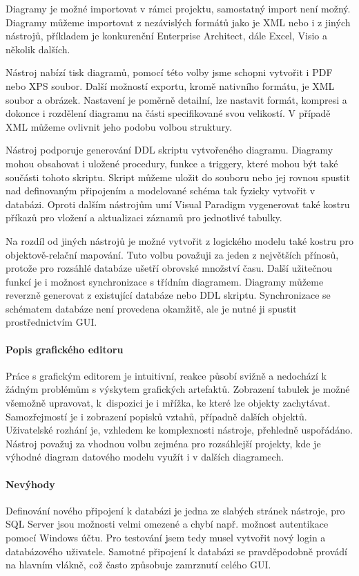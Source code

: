 \documentclass[czech,bachelor,public,dept460,male,oneside]{diploma}
\begin{document}
		Diagramy je možné importovat v rámci projektu, samostatný import není možný. Diagramy můžeme importovat z nezávislých formátů jako je XML nebo i z jiných nástrojů, příkladem je konkurenční Enterprise Architect, dále Excel, Visio a několik dalších. 
		
		Nástroj nabízí tisk diagramů, pomocí této volby jsme schopni vytvořit i PDF nebo XPS soubor. Další možností exportu, kromě nativního formátu, je XML soubor a obrázek. Nastavení je poměrně detailní, lze nastavit formát, kompresi a dokonce i rozdělení diagramu na části specifikované svou velikostí. V případě XML můžeme ovlivnit jeho podobu volbou struktury.
		
		Nástroj podporuje generování DDL skriptu vytvořeného diagramu. Diagramy mohou obsahovat i uložené procedury, funkce a triggery, které mohou být také součásti  tohoto skriptu. Skript můžeme uložit do souboru nebo jej rovnou spustit nad definovaným připojením a modelované schéma tak fyzicky vytvořit v databázi. Oproti dalším nástrojům umí Visual Paradigm vygenerovat také kostru příkazů pro vložení a aktualizaci záznamů pro jednotlivé tabulky.
		
		Na rozdíl od jiných nástrojů je možné vytvořit z logického modelu také kostru pro objektově-relační mapování. Tuto volbu považuji za jeden z největších přínosů, protože pro rozsáhlé databáze ušetří obrovské množství času. Další užitečnou funkcí je i možnost synchronizace s třídním diagramem. Diagramy můžeme reverzně generovat z existující databáze nebo DDL skriptu. Synchronizace se schématem databáze není provedena okamžitě, ale je nutné ji spustit prostřednictvím GUI. 
		
		\paragraph{Popis grafického editoru}
		Práce s grafickým editorem je intuitivní, reakce působí svižně a nedochází k žádným problémům s výskytem grafických artefaktů. Zobrazení tabulek je možné všemožně upravovat, k~dispozici je i mřížka, ke které lze objekty zachytávat. Samozřejmostí je i zobrazení popisků vztahů, případně dalších objektů. Uživatelské rozhání je, vzhledem ke komplexnosti nástroje, přehledně uspořádáno. Nástroj považuj za vhodnou volbu zejména pro rozsáhlejší projekty, kde je výhodné diagram datového modelu využít i v dalších diagramech.
		
		\paragraph{Nevýhody}
		Definování nového připojení k databázi je jedna ze slabých stránek nástroje, pro SQL Server jsou možnosti velmi omezené a chybí např. možnost autentikace pomocí Windows účtu. Pro testování jsem tedy musel vytvořit nový login a databázového uživatele. Samotné připojení k databázi se pravděpodobně provádí na hlavním vlákně, což často způsobuje zamrznutí celého GUI.
		
\end{document}
